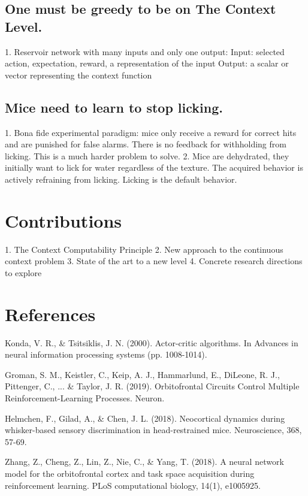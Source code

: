 \documentclass[]{article}
\begin{document}
\subsection{One must be greedy to be on The Context Level.}
1. Reservoir network with many inputs and only one output:
Input: selected action, expectation, reward, a representation of the input
Output: a scalar or vector representing the context function

\subsection{Mice need to learn to stop licking.}
1. Bona fide experimental paradigm: mice only receive a reward for correct hits and are punished for false alarms.  There is no feedback for withholding from licking.  This is a much harder problem to solve.
2. Mice are dehydrated, they initially want to lick for water regardless of the texture.  The acquired behavior is actively refraining from licking.  Licking is the default behavior.

\section{Contributions}
1. The Context Computability Principle
2. New approach to the continuous context problem
3. State of the art to a new level
4. Concrete research directions to explore

\section{References}

Konda, V. R., \& Tsitsiklis, J. N. (2000). Actor-critic algorithms. In Advances in neural information processing systems (pp. 1008-1014).

Groman, S. M., Keistler, C., Keip, A. J., Hammarlund, E., DiLeone, R. J., Pittenger, C., ... \& Taylor, J. R. (2019). Orbitofrontal Circuits Control Multiple Reinforcement-Learning Processes. Neuron.

Helmchen, F., Gilad, A., \& Chen, J. L. (2018). Neocortical dynamics during whisker-based sensory discrimination in head-restrained mice. Neuroscience, 368, 57-69.

Zhang, Z., Cheng, Z., Lin, Z., Nie, C., \& Yang, T. (2018). A neural network model for the orbitofrontal cortex and task space acquisition during reinforcement learning. PLoS computational biology, 14(1), e1005925.
\end{document}
